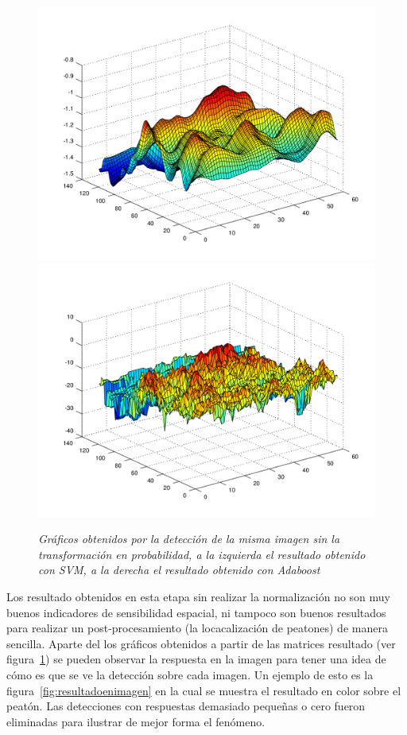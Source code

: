 \begin{figure}[H]
  \centering
  \includegraphics[scale=.3]{images/svmrawoutput}
  \includegraphics[scale=.3]{images/boostrawoutput}
  \caption{\em Gráficos obtenidos por la detección de la misma imagen sin la transformación en probabilidad, a la izquierda el resultado obtenido con SVM, a la derecha el resultado obtenido con Adaboost}  
  \label{fig:rawoutput}
\end{figure}


Los resultado obtenidos en esta etapa sin realizar la normalización no son muy buenos indicadores de sensibilidad espacial, ni tampoco son buenos resultados para realizar un post-procesamiento (la locacalización de peatones) de manera sencilla. Aparte del los gráficos obtenidos a partir de las matrices resultado (ver figura~\ref{fig:rawoutput}) se pueden observar la respuesta en la imagen para tener una idea de cómo es que se ve la detección sobre cada imagen. Un ejemplo de esto es la figura~\ref{fig:resultadoenimagen} en la cual se muestra el resultado en color sobre el peatón. Las detecciones con respuestas demasiado pequeñas o cero fueron eliminadas para ilustrar de mejor forma el fenómeno.

